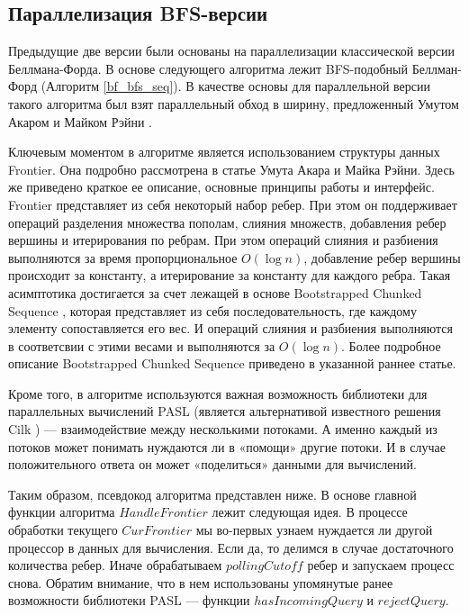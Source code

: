 \FloatBarrier
\subsection{Параллелизация BFS-версии}
Предыдущие две версии были основаны на параллелизации классической версии Беллмана-Форда. В основе следующего алгоритма лежит BFS-подобный Беллман-Форд (Алгоритм \ref{bf_bfs_seq}). В качестве основы для параллельной версии такого алгоритма был взят параллельный обход в ширину, предложенный Умутом Акаром и Майком Рэйни \cite{FRONTIERSEARCH}. 


Ключевым моментом в алгоритме является использованием структуры данных Frontier. Она подробно рассмотрена в статье Умута Акара и Майка Рэйни. Здесь же приведено краткое ее описание, основные принципы работы и интерфейс. Frontier представляет из себя некоторый набор ребер. При этом он поддерживает операций разделения множества пополам, слияния множеств, добавления ребер вершины и итерирования по ребрам. При этом  операций слияния и разбиения выполняются за время пропорциональное $O(\log n)$, добавление ребер вершины происходит за константу, а итерирование за константу для каждого ребра. Такая асимптотика достигается за счет лежащей в основе Bootstrapped Chunked Sequence \cite{CHUNKEDSEQ}, которая представляет из себя последовательность, где каждому элементу сопоставляется его вес. И операций слияния и разбиения выполняются в соответсвии с этими весами и выполняются за $O(\log n)$. Более подробное описание Bootstrapped Chunked Sequence приведено в указанной раннее статье. 

Кроме того, в алгоритме используются важная возможность библиотеки для параллельных вычислений PASL \cite{PASL} (является альтернативой известного решения Cilk \cite{CILK}) --- взаимодействие между несколькими потоками. А именно каждый из потоков может понимать нуждаются ли в «помощи» другие потоки. И в случае положительного ответа он может «поделиться» данными для вычислений. 

Таким образом, псевдокод алгоритма представлен ниже. В основе главной функции алгоритма $HandleFrontier$ лежит следующая идея. В процессе обработки текущего $CurFrontier$ мы во-первых узнаем нуждается ли другой процессор в данных для вычисления. Если да, то делимся в случае достаточного количества ребер. Иначе обрабатываем $pollingCutoff$ ребер и запускаем процесс снова. Обратим внимание, что в нем использованы упомянутые ранее возможности библиотеки PASL --- функции $hasIncomingQuery$ и $rejectQuery$. 

